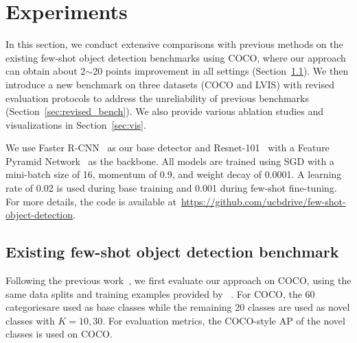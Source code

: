 \section{Experiments}

In this section, we conduct extensive comparisons with previous methods on the existing 
few-shot object detection benchmarks using COCO, where our approach can obtain
about 2$\sim$20 points improvement in all settings (Section~\ref{sec:exist_benchmark}). We then introduce a new benchmark on three datasets (COCO and LVIS) with revised evaluation protocols to address the unreliability of previous benchmarks (Section~\ref{sec:revised_bench}). We also provide various ablation studies and visualizations in Section~\ref{sec:vis}. 

We use Faster R-CNN~\cite{ren2015faster} as our base detector and Resnet-101~\cite{he2016deep} with a Feature Pyramid Network~\cite{lin2016feature} as the backbone.
All models are trained using SGD with a mini-batch size of 16, momentum of 0.9, and weight decay of 0.0001.
A learning rate of 0.02 is used during base training and 0.001 during few-shot fine-tuning.
For more details, the code is available at~\url{https://github.com/ucbdrive/few-shot-object-detection}.

\subsection{Existing few-shot object detection benchmark}
\label{sec:exist_benchmark}
Following the previous work~\cite{kang2019few,yan2019meta,wang2019meta}, we 
first evaluate our approach on COCO, using the same data splits and training examples provided by ~\citet{kang2019few}.
For COCO, the 60 categoriesare used as base classes while the remaining 20 classes are used as novel classes with $K=10, 30$.  For evaluation metrics, the COCO-style AP of the novel classes is used on COCO. 

